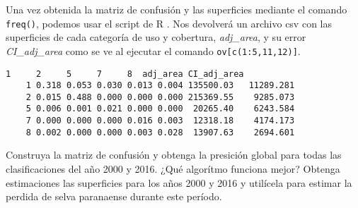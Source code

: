 \begin{exa}
  Una vez obtenida la matriz de confusi\'on y las superficies mediante el comando \texttt{freq()}, podemos usar el script de R . Nos devolver\'a un archivo csv con las superficies de cada categor\'ia de uso y cobertura, \emph{adj\_area}, y su error \emph{CI\_adj\_area} como se ve al ejecutar el comando \texttt{ov[c(1:5,11,12)]}.
  \begin{Verbatim}[fontsize=\small]
          1     2     5     7     8  adj_area CI_adj_area
    1 0.318 0.053 0.030 0.013 0.004 135500.03   11289.281
    2 0.015 0.488 0.000 0.000 0.000 215369.55    9285.073
    5 0.006 0.001 0.021 0.000 0.000  20265.40    6243.584
    7 0.000 0.000 0.000 0.016 0.003  12318.18    4174.173
    8 0.002 0.000 0.000 0.003 0.028  13907.63    2694.601
  \end{Verbatim}
\end{exa}


\begin{act}
    Construya la matriz de confusi\'on y obtenga la presici\'on global para todas las clasificaciones del a\~no 2000 y 2016. ¿Qu\'e algor\'itmo funciona mejor? Obtenga estimaciones las superficies para los a\~nos 2000 y 2016 y util\'icela para estimar la perdida de selva paranaense durante este per\'iodo.
\end{act}
